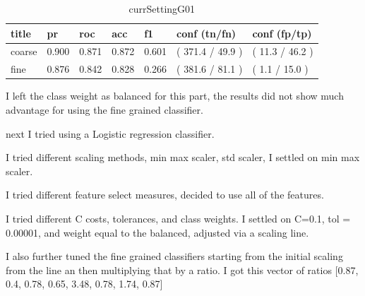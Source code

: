 \documentclass[ms]{nuthesis}
\begin{document}
\FloatBarrier
\begin{table}[h]
\centering
\begin{tabular}{|l||l||l||l||l||l||l|}\toprule
title & pr & roc & acc & f1 & conf (tn/fn) & conf (fp/tp) \\ \midrule
coarse & 0.900 & 0.871 & 0.872 & 0.601 & ( 371.4 / 49.9 ) & ( 11.3 / 46.2 ) \\
fine & 0.876 & 0.842 & 0.828 & 0.266 & ( 381.6 / 81.1 ) & ( 1.1 / 15.0 ) \\ \bottomrule
\end{tabular}
\caption{currSettingG01}
\label{tab:currSettingG01}
\end{table}
\FloatBarrier



\par I left the class weight as balanced for this part, the results did not show much advantage
for using the fine grained classifier.


\par next I tried using a Logistic regression classifier.
\par I tried different scaling methods, min max scaler, std scaler, I settled on min max scaler.
\par I tried different feature select measures, decided to use all of the features.
\par I tried different C costs, tolerances, and class weights. I settled on C=0.1, tol = 0.00001,
and weight equal to the balanced, adjusted via a scaling line.
\par I also further tuned the fine grained classifiers starting from the initial scaling from the
line an then multiplying that by a ratio.
I got this vector of ratios
[0.87, 0.4, 0.78, 0.65, 3.48, 0.78, 1.74, 0.87]

\break
\end{document}
